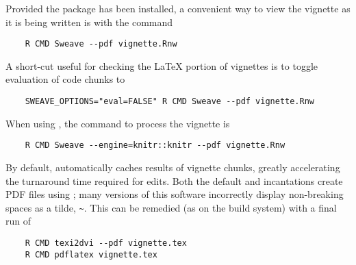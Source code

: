 \documentclass{article}
\begin{document}
Provided the package has been installed, a convenient way to view the
vignette as it is being written is with the command
\begin{verbatim}
    R CMD Sweave --pdf vignette.Rnw
\end{verbatim}
A short-cut useful for checking the \LaTeX{} portion of vignettes is
to toggle evaluation of code chunks to 
\begin{verbatim}
    SWEAVE_OPTIONS="eval=FALSE" R CMD Sweave --pdf vignette.Rnw
\end{verbatim}
When using , the command to process the vignette is
\begin{verbatim}
    R CMD Sweave --engine=knitr::knitr --pdf vignette.Rnw
\end{verbatim}
By default,  automatically caches results of vignette
chunks, greatly accelerating the turnaround time required for
edits. Both the default and  incantations create PDF
files using ; many versions of this software
incorrectly display non-breaking spaces as a tilde, \verb|~|. This can be
remedied (as on the \Bioconductor{} build system) with a final run of
\begin{verbatim}
    R CMD texi2dvi --pdf vignette.tex
    R CMD pdflatex vignette.tex
\end{verbatim}
\end{document}
